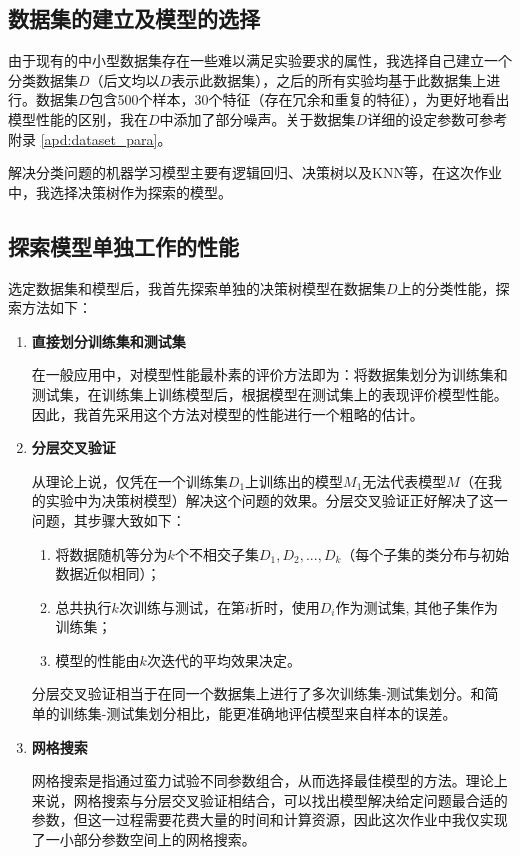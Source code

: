 \documentclass[12pt,a4paper]{article}
\theoremstyle{definition}
\begin{document}
\subsection{数据集的建立及模型的选择}

由于现有的中小型数据集存在一些难以满足实验要求的属性，我选择自己建立一个分类数据集$D$（后文均以$D$表示此数据集），之后的所有实验均基于此数据集上进行。数据集$D$包含500个样本，30个特征（存在冗余和重复的特征），为更好地看出模型性能的区别，我在$D$中添加了部分噪声。关于数据集$D$详细的设定参数可参考附录 \ref{apd:dataset_para}。

\vspace{0.015\linewidth}
解决分类问题的机器学习模型主要有逻辑回归、决策树以及KNN等，在这次作业中，我选择决策树作为探索的模型。

\subsection{探索模型单独工作的性能}

选定数据集和模型后，我首先探索单独的决策树模型在数据集$D$上的分类性能，探索方法如下：

\begin{enumerate}
\item \textbf{直接划分训练集和测试集}

在一般应用中，对模型性能最朴素的评价方法即为：将数据集划分为训练集和测试集，在训练集上训练模型后，根据模型在测试集上的表现评价模型性能。因此，我首先采用这个方法对模型的性能进行一个粗略的估计。

\item \textbf{分层交叉验证}

从理论上说，仅凭在一个训练集$D_1$上训练出的模型$M_1$无法代表模型$M$（在我的实验中为决策树模型）解决这个问题的效果。分层交叉验证正好解决了这一问题，其步骤大致如下：

\begin{enumerate}
	\item 将数据随机等分为$k$个不相交子集$D_1, D_2, ... ,D_k$（每个子集的类分布与初始数据近似相同）；
	
	\item 总共执行$k$次训练与测试，在第$i$折时，使用$D_i$作为测试集, 其他子集作为训练集；
	
	\item 模型的性能由$k$次迭代的平均效果决定。
\end{enumerate}

分层交叉验证相当于在同一个数据集上进行了多次训练集-测试集划分。和简单的训练集-测试集划分相比，能更准确地评估模型来自样本的误差。

\item \textbf{网格搜索}

网格搜索是指通过蛮力试验不同参数组合，从而选择最佳模型的方法。理论上来说，网格搜索与分层交叉验证相结合，可以找出模型解决给定问题最合适的参数，但这一过程需要花费大量的时间和计算资源，因此这次作业中我仅实现了一小部分参数空间上的网格搜索。

\end{enumerate}
\end{document}

